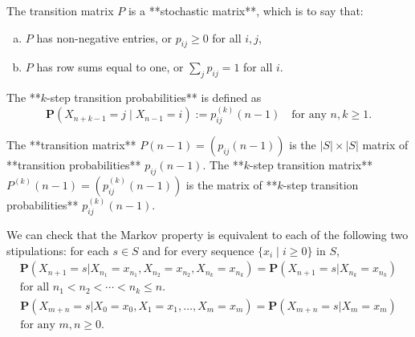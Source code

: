 \begin{theorem}
The transition matrix $P$ is a **stochastic matrix**, which is to say that: 
\begin{enumerate}[(a)]
    \item $P$ has non-negative entries, or $p_{ij} \geq 0$ for all $i, j$, 
    \item $P$ has row sums equal to one, or $\sum_j p_{ij} = 1$ for all $i$.
\end{enumerate}
\end{theorem}


\begin{definition}
The **$k$-step transition probabilities** is defined as
\begin{equation}
    \label{eq:7.2}
    \tag{7-2}
    \mathbf{P}(X_{n+k-1} = j \;\vert\; X_{n-1} = i) := p_{ij}^{(k)}(n-1) \quad \text{for any } n, k \geq 1.
\end{equation}
\end{definition}

\begin{definition}
The **transition matrix** $P(n-1) = (p_{ij}(n-1))$ is the $\left\vert S \right\vert \times \left\vert S \right\vert$ matrix of **transition probabilities** $p_{ij}(n-1)$. The **$k$-step transition matrix** $P^{(k)}(n-1) = (p_{ij}^{(k)}(n-1))$ is the matrix of **$k$-step transition probabilities** $p_{ij}^{(k)}(n-1)$.
\end{definition}

\begin{remark}
We can check that the Markov property is equivalent to each of the following two stipulations: for each $s \in S$ and for every sequence $\{ x_i \;\vert\; i \geq 0\}$ in $S$,
\begin{equation}
    \label{eq:7.3a}
    \tag{7-3a}
    \begin{split}
        \mathbf{P}\left(X_{n+1}=s | X_{n_{1}}=x_{n_{1}}, X_{n_{2}}=x_{n_{2}}, X_{n_{k}}=x_{n_{k}}\right)=\mathbf{P}\left(X_{n+1}=s | X_{n_{k}}=x_{n_{k}}\right) \\
        \text{for all } n_1 < n_2 < \cdots < n_k \leq n.
    \end{split}
\end{equation}
\begin{equation}
    \label{eq:7.3b}
    \tag{7-3b}
    \begin{split}
        \mathbf{P}\left(X_{m+n}=s | X_{0}=x_{0}, X_{1}=x_{1}, \ldots, X_{m}=x_{m}\right)=\mathbf{P}\left(X_{m+n}=s | X_{m}=x_{m}\right) \\ 
        \text{for any } m, n \geq 0.
    \end{split}
\end{equation}
\end{remark}

